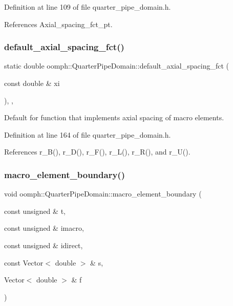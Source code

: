 Definition at line 109 of file quarter\+\_\+pipe\+\_\+domain.\+h.



References Axial\+\_\+spacing\+\_\+fct\+\_\+pt.

\mbox{\label{classoomph_1_1QuarterPipeDomain_a3b79d0bf40336f7961a8b2bb58080dba}} 
\subsubsection{\texorpdfstring{default\+\_\+axial\+\_\+spacing\+\_\+fct()}{default\_axial\_spacing\_fct()}}
{\footnotesize\ttfamily static double oomph\+::\+Quarter\+Pipe\+Domain\+::default\+\_\+axial\+\_\+spacing\+\_\+fct (\begin{DoxyParamCaption}\item[{const double \&}]{xi }\end{DoxyParamCaption})\hspace{0.3cm}{\ttfamily [inline]}, {\ttfamily [static]}, {\ttfamily [private]}}



Default for function that implements axial spacing of macro elements. 



Definition at line 164 of file quarter\+\_\+pipe\+\_\+domain.\+h.



References r\+\_\+\+B(), r\+\_\+\+D(), r\+\_\+\+F(), r\+\_\+\+L(), r\+\_\+\+R(), and r\+\_\+\+U().

\mbox{\label{classoomph_1_1QuarterPipeDomain_ae8cc6433c58dcfb265335744ed8a330a}} 
\subsubsection{\texorpdfstring{macro\+\_\+element\+\_\+boundary()}{macro\_element\_boundary()}}
{\footnotesize\ttfamily void oomph\+::\+Quarter\+Pipe\+Domain\+::macro\+\_\+element\+\_\+boundary (\begin{DoxyParamCaption}\item[{const unsigned \&}]{t,  }\item[{const unsigned \&}]{imacro,  }\item[{const unsigned \&}]{idirect,  }\item[{const Vector$<$ double $>$ \&}]{s,  }\item[{Vector$<$ double $>$ \&}]{f }\end{DoxyParamCaption})}



